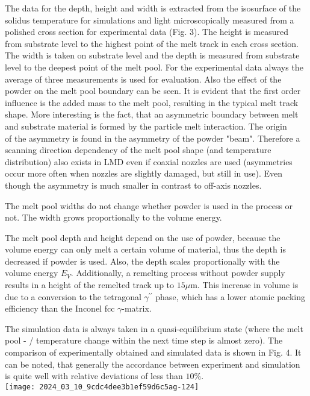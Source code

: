 \documentclass[10pt]{article}
\begin{document}
The data for the depth, height and width is extracted from the isosurface of the solidus temperature for simulations and light microscopically measured from a polished cross section for experimental data (Fig. 3). The height is measured from substrate level to the highest point of the melt track in each cross section. The width is taken on substrate level and the depth is measured from substrate level to the deepest point of the melt pool. For the experimental data always the average of three measurements is used for evaluation. Also the effect of the powder on the melt pool boundary can be seen. It is evident that the first order influence is the added mass to the melt pool, resulting in the typical melt track shape. More interesting is the fact, that an asymmetric boundary between melt and substrate material is formed by the particle melt interaction. The origin\\
of the asymmetry is found in the asymmetry of the powder "beam". Therefore a scanning direction dependency of the melt pool shape (and temperature distribution) also exists in LMD even if coaxial nozzles are used (asymmetries occur more often when nozzles are slightly damaged, but still in use). Even though the asymmetry is much smaller in contrast to off-axis nozzles.

The melt pool widths do not change whether powder is used in the process or not. The width grows proportionally to the volume energy.

The melt pool depth and height depend on the use of powder, because the volume energy can only melt a certain volume of material, thus the depth is decreased if powder is used. Also, the depth scales proportionally with the volume energy $E_{V}$. Additionally, a remelting process without powder supply results in a height of the remelted track up to $15 \mu \mathrm{m}$. This increase in volume is due to a conversion to the tetragonal $\gamma^{\prime \prime}$ phase, which has a lower atomic packing efficiency than the Inconel fcc $\gamma$-matrix.

The simulation data is always taken in a quasi-equilibrium state (where the melt pool - / temperature change within the next time step is almost zero). The comparison of experimentally obtained and simulated data is shown in Fig. 4. It can be noted, that generally the accordance between experiment and simulation is quite well with relative deviations of less than $10 \%$.\\
\texttt{[image: 2024\_03\_10\_9cdc4dee3b1ef59d6c5ag-124]}
\end{document}
